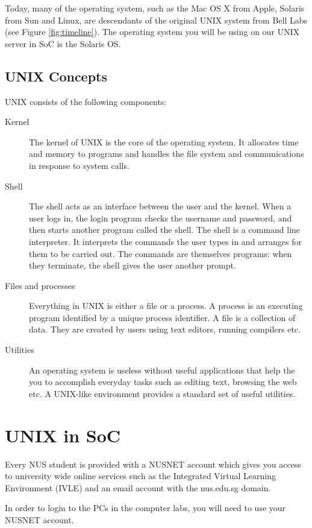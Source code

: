 \documentclass[a4paper]{beamer}
\begin{document}
Today, many of the operating system, such as the Mac OS X from Apple, Solaris
from Sun and Linux, are descendants of the original UNIX system from Bell Labs
(see Figure \ref{fig:timeline}). The operating system you will be using on our
UNIX server in SoC is the Solaris OS.

\subsection{UNIX Concepts}
UNIX consists of the following components:
\begin{description}
\item[Kernel] The kernel of UNIX is the core of the operating system. It
allocates time and memory to programs and handles the file system and
communications in response to system calls.  
\item[Shell] The shell acts as an interface between the user and the kernel.
When a user logs in, the login program checks the username and password, and
then starts another program called the shell.   The shell is a command line
interpreter. It interprets the commands the user types in and arranges for them
to be carried out. The commands are themselves programs: when they terminate,
the shell gives the user another prompt.  
\item[Files and processes] Everything in UNIX is either a file or a process.  A
process is an executing program identified by a unique process identifier.  A
file is a collection of data. They are created by users using text editors,
running compilers etc.
\item[Utilities] An operating system is useless without useful applications that
help the you to accomplish everyday tasks such as editing text, browsing the web
etc.  A UNIX-like environment provides a standard set of useful utilities.  
\end{description}

\section{UNIX in SoC}

Every NUS student is provided with a NUSNET account which gives you access to
university wide online services such as the Integrated Virtual Learning
Environment (IVLE) and an email account with the nus.edu.sg domain. 

In order to login to the PCs in the computer labs, you will need to use your
NUSNET account.   
\end{document}
